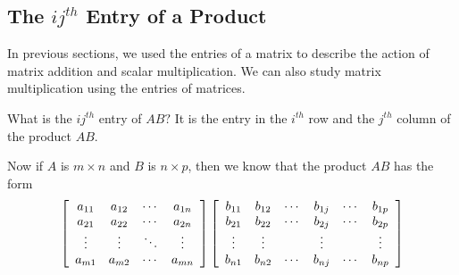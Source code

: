 \subsection{The \texorpdfstring{$ij^{th}$}{ijth} Entry of a Product}

In previous sections, we used the entries of a matrix to describe the action of matrix addition and scalar multiplication.
We can also study matrix multiplication using the entries of matrices. 

What is the $ij^{th}$ entry of $AB?$ It is the entry in the $i^{th}$ row
and the $j^{th}$ column of the product $AB$. 
 
Now if $A$ is $m \times n$ and $B$ is $n \times p$, then we know that the product $AB$ has the form 
\begin{equation*}
\left[
\begin{array}{cccc}
a_{11} & a_{12} & \cdots & a_{1n} \\
a_{21} & a_{22} & \cdots & a_{2n} \\
\vdots & \vdots &  \ddots & \vdots \\
a_{m1} & a_{m2} & \cdots & a_{mn}
\end{array}
\right] \left[
\begin{array}{cccccc}
b_{11} & b_{12} & \cdots & b_{1j} & \cdots & b_{1p} \\
b_{21} & b_{22} & \cdots & b_{2j} & \cdots & b_{2p} \\
\vdots & \vdots &  & \vdots & & \vdots\\
b_{n1} & b_{n2} & \cdots & b_{nj} & \cdots & b_{np}
\end{array}
\right] 
\end{equation*}

